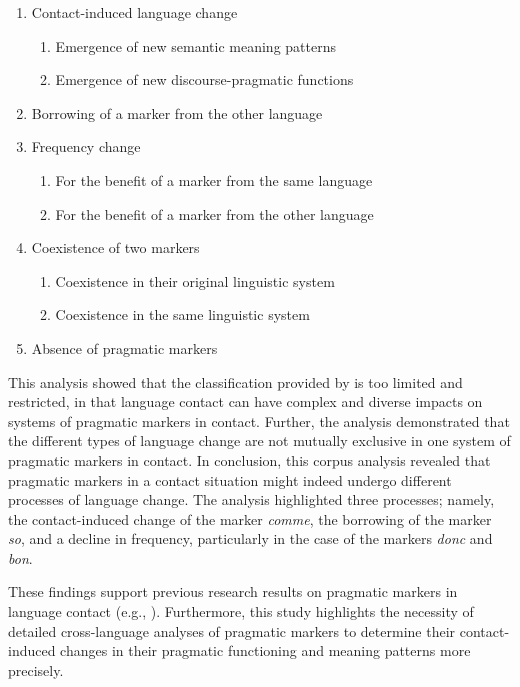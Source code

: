 \documentclass[output=paper]{langscibook}
\begin{document}
\begin{enumerate}
    \item Contact-induced language change
          \begin{enumerate}
              \item Emergence of new semantic meaning patterns
              \item Emergence of new discourse-pragmatic functions
          \end{enumerate}
    \item Borrowing of a marker from the other language
    \item Frequency change
          \begin{enumerate}
              \item For the benefit of a marker from the same language
              \item For the benefit of a marker from the other language
          \end{enumerate}
    \item Coexistence of two markers
          \begin{enumerate}
              \item Coexistence in their original linguistic system
              \item Coexistence in the same linguistic system
          \end{enumerate}
    \item Absence of pragmatic markers
\end{enumerate}


This analysis showed that the classification provided by \citet{Torres.2008} is too limited and restricted, in that language contact can have complex and diverse impacts on systems of pragmatic markers in contact. Further, the analysis demonstrated that the different types of language change are not mutually exclusive in one system of pragmatic markers in contact. In conclusion, this corpus analysis revealed that pragmatic markers in a contact situation might indeed undergo different processes of language change. The analysis highlighted three processes; namely, the contact-induced change of the marker \textit{comme}, the borrowing of the marker \textit{so}, and a decline in frequency, particularly in the case of the markers \textit{donc} and \textit{bon}.

These findings support previous research results on pragmatic markers in language contact (e.g., \citealt{Torres.2008,Hlavac.2006}). Furthermore, this study highlights the necessity of detailed cross-language analyses of pragmatic markers to determine their contact-induced changes in their pragmatic functioning and meaning patterns more precisely.

\printbibliography[heading=subbibliography, notkeyword=this]
\end{document}
